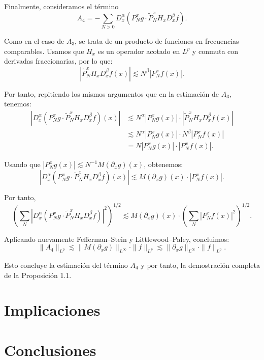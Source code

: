 \documentclass{aleph-revista}
\begin{document}
Finalmente, consideramos el t\'ermino
\[
A_4 = - \sum_{N>0} D_x^\alpha (P_N^x g \cdot \widetilde{P}_N^x H_x D_x^\beta f).
\]

Como en el caso de $A_3$, se trata de un producto de funciones en frecuencias comparables. Usamos que $H_x$ es un operador acotado en $L^p$ y conmuta con derivadas fraccionarias, por lo que:
\[
|\widetilde{P}_N^x H_x D_x^\beta f(x)| \lesssim N^\beta |P_N^x f(x)|.
\]

Por tanto, repitiendo los mismos argumentos que en la estimaci\'on de $A_3$, tenemos:
\begin{align*}
|D_x^\alpha (P_N^x g \cdot \widetilde{P}_N^x H_x D_x^\beta f)(x)| &\lesssim N^\alpha |P_N^x g(x)| \cdot |\widetilde{P}_N^x H_x D_x^\beta f(x)| \\
&\lesssim N^\alpha |P_N^x g(x)| \cdot N^\beta |P_N^x f(x)| \\
&= N |P_N^x g(x)| \cdot |P_N^x f(x)|.
\end{align*}

Usando que $|P_N^x g(x)| \lesssim N^{-1} M(\partial_x g)(x)$, obtenemos:
\[
|D_x^\alpha (P_N^x g \cdot \widetilde{P}_N^x H_x D_x^\beta f)(x)| \lesssim M(\partial_x g)(x) \cdot |P_N^x f(x)|.
\]

Por tanto,
\[
\left( \sum_{N} |D_x^\alpha (P_N^x g \cdot \widetilde{P}_N^x H_x D_x^\beta f)|^2 \right)^{1/2} \lesssim M(\partial_x g)(x) \cdot \left( \sum_N |P_N^x f(x)|^2 \right)^{1/2}.
\]

Aplicando nuevamente Fefferman--Stein y Littlewood--Paley, concluimos:
\[
\|A_4\|_{L^p} \lesssim \|M(\partial_x g)\|_{L^\infty} \cdot \|f\|_{L^p} \lesssim \|\partial_x g\|_{L^\infty} \cdot \|f\|_{L^p}.
\]

Esto concluye la estimaci\'on del t\'ermino $A_4$ y por tanto, la demostraci\'on completa de la Proposici\'on 1.1.
\section{Implicaciones}
\section{Conclusiones}
\newpage
\nocite{*}
\printbibliography
\end{document}
